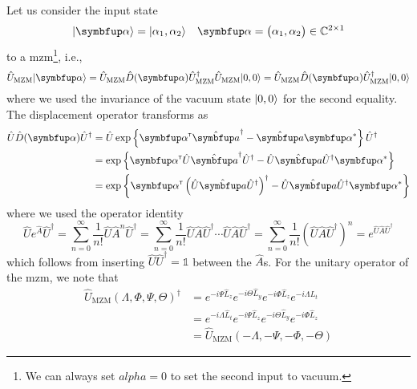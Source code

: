 Let us consider the input state
\begin{align}
	\ket{\vb{\alpha}}
	&=
	\ket{\alpha_1,\alpha_2}
	&
	\vb{\alpha}
	=
	\begin{pmatrix}
		\alpha_1,
		\alpha_2
	\end{pmatrix}
	\in
	\mathbb{C}^{2\times1}
\end{align}
to a \gls{mzm}\footnote{We can always set $alpha=0$ to set the second input to vacuum.}, i.e.,
\begin{equation}
	\hat{U}_\text{MZM}
	\ket{\vb{\alpha}}
	=
	\hat{U}_\text{MZM}
	\hat{D}(\vb{\alpha})
	\hat{U}_\text{MZM}^\dagger
	\hat{U}_\text{MZM}
	\ket{0,0}
	=
	\hat{U}_\text{MZM}
	\hat{D}(\vb{\alpha})
	\hat{U}_\text{MZM}^\dagger
	\ket{0,0}
\end{equation}
where we used the invariance of the vacuum state $\lvert0,0\rangle$ for the second equality.
The displacement operator transforms as
\begin{equation}
	\begin{split}
		\hat{U}
		\hat{D}(\vb{\alpha})
		\hat{U}^\dagger
		&=
		\hat{U}
		\exp\left\{
			\vb{\alpha}^\trans
			\hat{\vb{a}}^\dagger
			-
			\hat{\vb{a}}
			\vb{\alpha}^*
		\right\}
		\hat{U}^\dagger
		\\
		&=
		\exp\left\{
			\vb{\alpha}^\trans
			\hat{U}
			\hat{\vb{a}}^\dagger
			\hat{U}^\dagger
			-
			\hat{U}
			\hat{\vb{a}}
			\hat{U}^\dagger
			\vb{\alpha}^*
		\right\}
		\\
		&=
		\exp\left\{
			\vb{\alpha}^\trans
			\left(
				\hat{U}
				\hat{\vb{a}}
				\hat{U}^\dagger
			\right)^\dagger
			-
			\hat{U}
			\hat{\vb{a}}
			\hat{U}^\dagger
			\vb{\alpha}^*
		\right\}
	\end{split}
\end{equation}
where we used the operator identity
\begin{equation}
	\hat{U}
	e^{\hat{A}}
	\hat{U}^\dagger
	=
	\sum_{n=0}^\infty
	\frac{1}{n!}
	\hat{U}
	\hat{A}^n
	\hat{U}^\dagger
	=
	\sum_{n=0}^\infty
	\frac{1}{n!}
	\hat{U}
	\hat{A}
	\hat{U}^\dagger
	\cdots
	\hat{U}
	\hat{A}
	\hat{U}^\dagger
	=
	\sum_{n=0}^\infty
	\frac{1}{n!}
	\left(
		\hat{U}
		\hat{A}
		\hat{U}^\dagger
	\right)^n
	=
	e^{\hat{U}\hat{A}\hat{U}^\dagger}
\end{equation}
which follows from inserting $\hat{U}\hat{U}^\dagger=\mathbb{1}$ between the $\hat{A}$s.
For the unitary operator of the \gls{mzm}, we note that
\begin{equation}
	\begin{split}
		\hat{U}_\text{MZM}(\Lambda,\Phi,\Psi,\Theta)^\dagger
		&=
		e^{-i\Psi\hat{L}_z}
		e^{-i\Theta\hat{L}_y}
		e^{-i\Phi\hat{L}_z}
		e^{-i\Lambda\hat{L}_t}
		\\
		&=
		e^{-i\Lambda\hat{L}_t}
		e^{-i\Psi\hat{L}_z}
		e^{-i\Theta\hat{L}_y}
		e^{-i\Phi\hat{L}_z}
		\\
		&=
		\hat{U}_\text{MZM}(-\Lambda,-\Psi,-\Phi,-\Theta)
	\end{split}
\end{equation}
